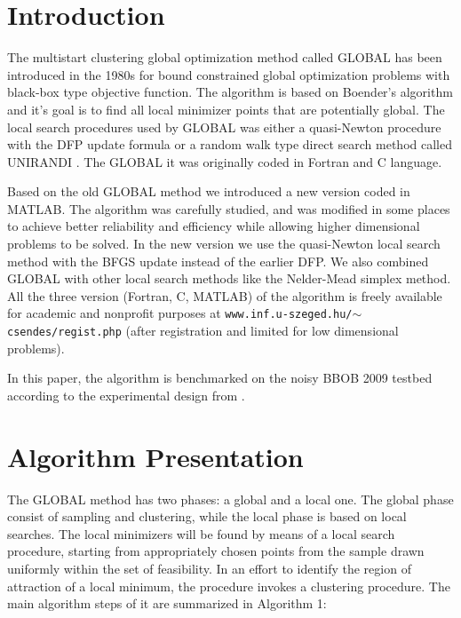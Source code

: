 \documentclass{sig-alternate}
\begin{document}

 \section{Introduction}

 The multistart clustering global optimization method called GLOBAL \cite{csendes1988}
has been introduced in the 1980s for bound constrained global optimization problems
with black-box type objective function. The algorithm is based on Boender's algorithm \cite{boender1982} and it's goal is to find all local minimizer points that are potentially global. The local search procedures used by GLOBAL was either a quasi-Newton procedure with the DFP update formula or a random walk type direct search
method called UNIRANDI \cite{jarvi1973}. The GLOBAL it was originally coded in Fortran and C language.

Based on the old GLOBAL method we introduced a new version \cite{csendes2008} coded in MATLAB.
The algorithm was carefully studied, and was modified in some places to
achieve better reliability and efficiency while allowing higher dimensional problems
to be solved. In the new version we use the quasi-Newton local search method with
the BFGS update instead of the earlier DFP. We also combined GLOBAL with other local search methods like the Nelder-Mead simplex method. All the three version (Fortran, C, MATLAB) of the algorithm is freely available  for academic and nonprofit purposes at {\tt www.inf.u-szeged.hu/$\sim$csendes/regist.php} (after registration and limited for
low dimensional problems).

In this paper, the algorithm is benchmarked on the noisy BBOB 2009
testbed  \cite{wp200902, hansen2009noi} according to the experimental design from \cite{hansen2009exp}.


\section{Algorithm Presentation}

The GLOBAL method has two phases: a global and a local one. The global phase consist of sampling and clustering, while the local phase is based on local searches. The local minimizers
will be found by means of a local search procedure, starting from appropriately
chosen points from the sample drawn uniformly within the set of feasibility. In
an effort to identify the region of attraction of a local minimum, the procedure
invokes a clustering procedure. The main algorithm steps of it are summarized in
Algorithm 1:
\end{document}
